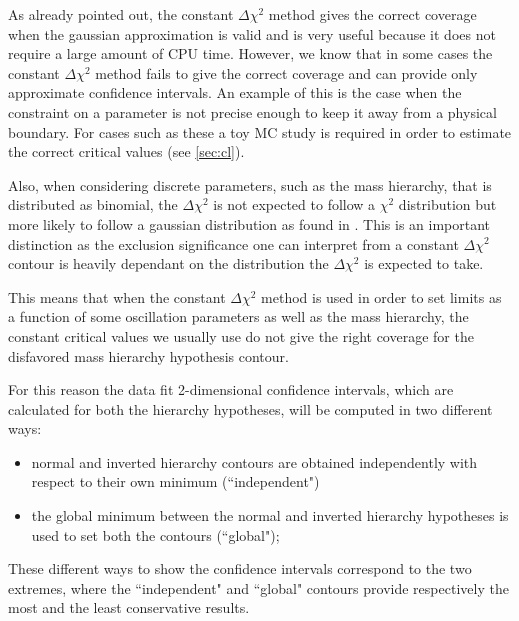 As already pointed out, the constant $\Delta \chi^2$ method gives the correct coverage 
when the gaussian approximation is valid and is very useful because it does not require a large amount of CPU time.
However, we know that in some cases the constant $\Delta \chi^2$ method fails to give the correct coverage
and can provide only approximate confidence intervals.
An example of this is the case when the constraint on a parameter is not precise enough to keep it away from a physical boundary. 
For cases such as these a toy MC study is required in order to estimate the correct critical values
(see \cref{sec:cl}).

Also, when considering discrete parameters, such as the mass hierarchy, that is distributed as binomial,
the $\Delta \chi^2$ is not expected to follow a 
$\chi^2$ distribution but more likely to follow a gaussian distribution as found in \cite{cl_masshierarchy}. This is an important 
distinction as the exclusion significance one can interpret from a constant $\Delta \chi^2$ contour is heavily dependant on the 
distribution the $\Delta \chi^2$ is expected to take. 


This means that when the constant $\Delta \chi^2$ method is used in order 
to set limits as a function of some oscillation parameters as well as the mass hierarchy,
the constant critical values we usually use
do not give the right coverage for the disfavored mass hierarchy hypothesis contour.

For this reason the data fit 2-dimensional confidence intervals, 
which are calculated for both the hierarchy hypotheses, 
will be computed in two different ways:
\begin{itemize}
\item normal and inverted hierarchy contours are obtained independently
	with respect to their own minimum (``independent")
\item the global minimum between the normal and inverted hierarchy hypotheses
	is used to set both the contours (``global");
\end{itemize}
These different ways to show the confidence intervals correspond
to the two extremes, where the ``independent" and ``global" contours 
provide respectively the most and the least conservative results.

